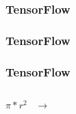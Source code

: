\begin{frame}
  \frametitle{TensorFlow}
\end{frame}

\begin{frame}
  \frametitle{TensorFlow}
\end{frame}

\begin{frame}
  \frametitle{TensorFlow}
  \begin{minipage}[l]{0.15\linewidth}
      $\;$
  \end{minipage}\hfill
  \begin{minipage}[l]{0.35\linewidth}
    \huge
    \begin{center}
      $\pi*r^2\;\;\;\rightarrow$
    \end{center}
  \end{minipage}\hfill
  \begin{minipage}[l]{0.49\linewidth}
  \end{minipage}\hfill
\end{frame}
